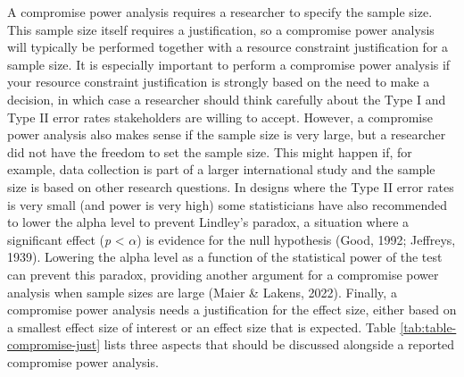 \documentclass[
  english,
  ,jou,floatsintext]{apa6}
\begin{document}
A compromise power analysis requires a researcher to specify the sample size. This sample size itself requires a justification, so a compromise power analysis will typically be performed together with a resource constraint justification for a sample size. It is especially important to perform a compromise power analysis if your resource constraint justification is strongly based on the need to make a decision, in which case a researcher should think carefully about the Type I and Type II error rates stakeholders are willing to accept. However, a compromise power analysis also makes sense if the sample size is very large, but a researcher did not have the freedom to set the sample size. This might happen if, for example, data collection is part of a larger international study and the sample size is based on other research questions. In designs where the Type II error rates is very small (and power is very high) some statisticians have also recommended to lower the alpha level to prevent Lindley's paradox, a situation where a significant effect (\emph{p} \textless{} \(\alpha\)) is evidence for the null hypothesis (Good, 1992; Jeffreys, 1939). Lowering the alpha level as a function of the statistical power of the test can prevent this paradox, providing another argument for a compromise power analysis when sample sizes are large (Maier \& Lakens, 2022). Finally, a compromise power analysis needs a justification for the effect size, either based on a smallest effect size of interest or an effect size that is expected. Table \ref{tab:table-compromise-just} lists three aspects that should be discussed alongside a reported compromise power analysis.
\end{document}
